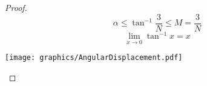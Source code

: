 \begin{proof}
$$\alpha \leq \tan^{-1} \frac{3}{N} \leq M = \frac{3}{N}$$
$$ \lim_{x\rightarrow 0} \tan^{-1} x = x$$

\begin{minipage}{\linewidth}
\begin{center}
\texttt{[image: graphics/AngularDisplacement.pdf]}
\end{center}
\end{minipage}



\end{proof}





















































































